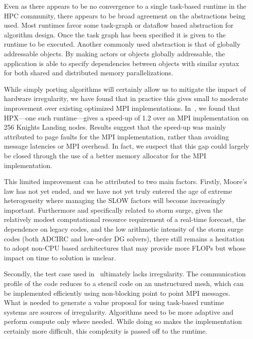 Even as there appears to be no convergence to a single task-based runtime in the HPC community, there appears to be broad agreement on the abstractions being used. Most runtimes favor some task-graph or dataflow based abstraction for algorithm design. Once the task graph has been specified it is given to the runtime to be executed. Another commonly used abstraction is that of globally addressable objects. By making actors or objects globally addressable, the application is able to specify dependencies between objects with similar syntax for both shared and distributed memory parallelizations.

While simply porting algorithms will certainly allow us to mitigate the impact of hardware irregularity, we have found that in practice this gives small to moderate improvement over existing optimized MPI implementations.
In~\cite{Bremer2019}, we found that HPX---one such runtime---gives a speed-up of 1.2 over an MPI implementation on 256 Knights Landing nodes. Results suggest that the speed-up was mainly attributed to page faults for the MPI implementation, rather than avoiding message latencies or MPI overhead. In fact, we suspect that this gap could largely be closed through the use of a better memory allocator for the MPI implementation.

This limited improvement can be attributed to two main factors. Firstly, Moore's law has not yet ended, and we have not yet truly entered the age of extreme heterogeneity where managing the SLOW factors will become increasingly important.
Furthermore and specifically related to storm surge, given the relatively modest computational resource requirement of a real-time forecast, the dependence on legacy codes, and the low arithmetic intensity of the storm surge codes (both ADCIRC and low-order DG solvers), there still remains a hesitation to adopt non-CPU based architectures that may provide more FLOPs but whose impact on time to solution is unclear.

Secondly, the test case used in~\cite{Bremer2019} ultimately lacks irregularity. The communication profile of the code reduces to a stencil code on an unstructured mesh, which can be implemented efficiently using non-blocking point to point MPI messages. What is needed to generate a value proposal for using task-based runtime systems are sources of irregularity. Algorithms need to be more adaptive and perform compute only where needed. While doing so makes the implementation certainly more difficult, this complexity is passed off to the runtime.

